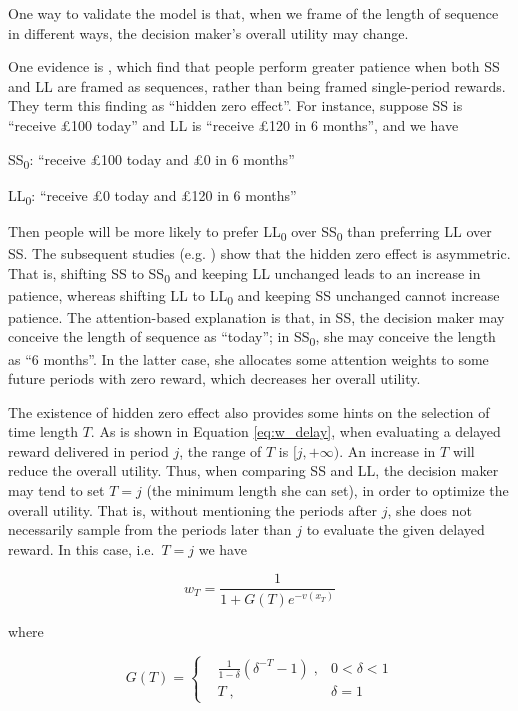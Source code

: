 \documentclass[
  12pt,
]{article}
\begin{document}
One way to validate the model is that, when we frame of the length of
sequence in different ways, the decision maker's overall utility may
change.

One evidence is \citet{magen_hidden-zero_2008}, which find that people
perform greater patience when both SS and LL are framed as sequences,
rather than being framed single-period rewards. They term this finding
as ``hidden zero effect''. For instance, suppose SS is ``receive £100
today'' and LL is ``receive £120 in 6 months'', and we have

SS\textsubscript{0}: ``receive £100 today and £0 in 6 months''

LL\textsubscript{0}: ``receive £0 today and £120 in 6 months''

Then people will be more likely to prefer LL\textsubscript{0} over
SS\textsubscript{0} than preferring LL over SS. The subsequent studies
(e.g. \citet{read_value_2017}) show that the hidden zero effect is
asymmetric. That is, shifting SS to SS\textsubscript{0} and keeping LL
unchanged leads to an increase in patience, whereas shifting LL to
LL\textsubscript{0} and keeping SS unchanged cannot increase patience.
The attention-based explanation is that, in SS, the decision maker may
conceive the length of sequence as ``today''; in SS\textsubscript{0},
she may conceive the length as ``6 months''. In the latter case, she
allocates some attention weights to some future periods with zero
reward, which decreases her overall utility.

The existence of hidden zero effect also provides some hints on the
selection of time length \(T\). As is shown in Equation
\ref{eq:w_delay}, when evaluating a delayed reward delivered in period
\(j\), the range of \(T\) is \([j,+\infty)\). An increase in \(T\) will
reduce the overall utility. Thus, when comparing SS and LL, the decision
maker may tend to set \(T=j\) (the minimum length she can set), in order
to optimize the overall utility. That is, without mentioning the periods
after \(j\), she does not necessarily sample from the periods later than
\(j\) to evaluate the given delayed reward. In this case, i.e.~\(T=j\)
we have

\[
w_T = \frac{1}{1+G(T)e^{-v(x_T)}}
\]

where

\[
G(T) = \left\{ \begin{aligned}
& \frac{1}{1-\delta}(\delta^{-T}-1) \; ,& 0<\delta<1\\
& T\; ,& \delta=1\
\end{aligned}
\right.
\]
\end{document}
